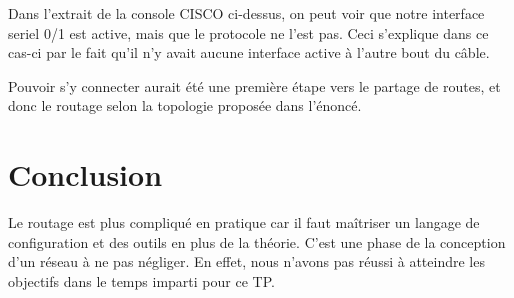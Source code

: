 \documentclass{article}
\begin{document}
Dans l'extrait de la console CISCO ci-dessus, on peut voir que notre interface seriel 0/1 est active, mais que le protocole ne l'est pas. Ceci s'explique dans ce cas-ci par le fait qu'il n'y avait aucune interface active à l'autre bout du câble.

Pouvoir s'y connecter aurait été une première étape vers le partage de routes, et donc le routage selon la topologie proposée dans l'énoncé.

\section{Conclusion}
Le routage est plus compliqué en pratique car il faut maîtriser un langage de configuration et des outils en plus de la théorie. C'est une phase de la conception d'un réseau à ne pas négliger. En effet, nous n'avons pas réussi à atteindre les objectifs dans le temps imparti pour ce TP.
\end{document}
